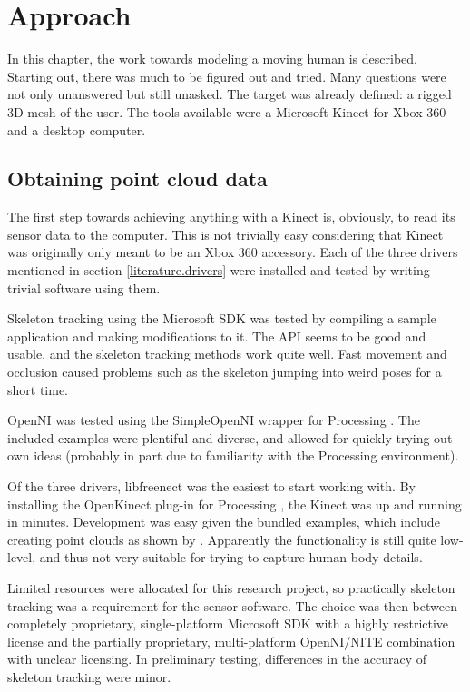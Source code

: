 \chapter{Approach}

In this chapter, the work towards modeling a moving human is described. Starting out, there was much to be figured out and tried. Many questions were not only unanswered but still unasked. The target was already defined: a rigged 3D mesh of the user. The tools available were a Microsoft Kinect for Xbox 360 and a desktop computer.

\section{Obtaining point cloud data}

The first step towards achieving anything with a Kinect is, obviously, to read its sensor data to the computer. This is not trivially easy considering that Kinect was originally only meant to be an Xbox 360 accessory. Each of the three drivers mentioned in section \ref{literature.drivers} were installed and tested by writing trivial software using them.

Skeleton tracking using the Microsoft SDK was tested by compiling a sample application and making modifications to it. The API seems to be good and usable, and the skeleton tracking methods work quite well. Fast movement and occlusion caused problems such as the skeleton jumping into weird poses for a short time.

OpenNI was tested using the SimpleOpenNI \citep{simpleopenni} wrapper for Processing \citep{processing}. The included examples were plentiful and diverse, and allowed for quickly trying out own ideas (probably in part due to familiarity with the Processing environment).

Of the three drivers, libfreenect was the easiest to start working with. By installing the OpenKinect plug-in for Processing \citep{shiffman2010} \citep{processing}, the Kinect was up and running in minutes. Development was easy given the bundled examples, which include creating point clouds as shown by \citet{fisher2010}. Apparently the functionality is still quite low-level, and thus not very suitable for trying to capture human body details.

Limited resources were allocated for this research project, so practically skeleton tracking was a requirement for the sensor software. The choice was then between completely proprietary, single-platform Microsoft SDK with a highly restrictive license and the partially proprietary, multi-platform OpenNI/NITE combination with unclear licensing. In preliminary testing, differences in the accuracy of skeleton tracking were minor.

